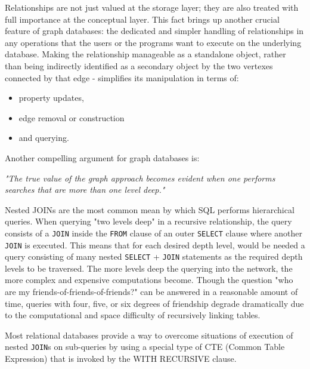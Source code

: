 Relationships are not just valued at the storage layer;
they are also treated with full importance at the conceptual layer.
This fact brings up another crucial feature of graph databases:
the dedicated and simpler handling of relationships in any operations that the users or the programs want to execute on the underlying database.
Making the relationship manageable as a standalone object, rather than being indirectly identified as a secondary object by the two vertexes connected by that edge - simplifies its manipulation in terms of:
 \begin{itemize}[noitemsep]
	\item property updates,
	\item edge removal or construction
	\item and querying.
\end{itemize}

Another compelling argument for graph databases is:
\begin{quoting}[begintext={}, endtext={}]
	\textit{"The true value of the graph approach becomes evident when one performs searches that are more than one level deep."}
\end{quoting}

Nested JOINs are the most common mean by which SQL performs hierarchical queries.
When querying "two levels deep" in a recursive relationship, the query consists of a \texttt{JOIN} inside the \texttt{FROM} clause of an outer \texttt{SELECT} clause where another \texttt{JOIN} is executed.
This means that for each desired depth level, would be needed a query consisting of many nested \texttt{SELECT} + \texttt{JOIN} statements as the required depth levels to be traversed.
The more levels deep the querying into the network, the more complex and expensive computations become.
Though the question "who are my friends-of-friends-of-friends?" can be answered in a reasonable amount of time, queries with four, five, or six degrees of friendship degrade dramatically due to the computational and space difficulty of recursively linking tables.

Most relational databases provide a way to overcome situations of execution of nested \texttt{JOIN}s on sub-queries by using a special type of CTE (Common Table Expression) that is invoked by the WITH RECURSIVE clause.

